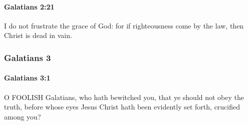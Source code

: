		\paragraph{Galatians 2:21} %
			\label{GALATIANS-2-21}

			I do not frustrate the grace of God: for if righteousness come by the law, then Christ is dead in vain.

			\begin{framed}
			\scriptsize
				\begin{compactdesc}
					\item[SBLG] 
				\end{compactdesc}
			\end{framed}

	\subsubsection{Galatians 3} %
		\label{GALATIANS-3}
		
		\paragraph{Galatians 3:1} %
			\label{GALATIANS-3-1}

			O FOOLISH Galatians, who hath bewitched you, that ye should not obey the truth, before whose eyes Jesus Christ hath been evidently set forth, crucified among you?

